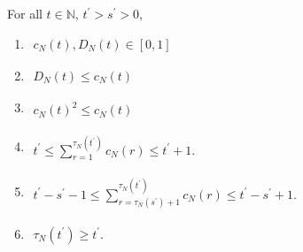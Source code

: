 \begin{prop}\label{thm:cN_properties}
For all $t\in\mathbb{N}$, $t^\prime > s^\prime >0$,
\begin{enumerate}[label=(\alph*)]
\item \label{item:cN_property1} \hspace{5pt}
    $\begin{aligned}
    c_N(t) , D_N(t) \in [0,1]
    \end{aligned}$
\item \label{item:cN_property2} \hspace{5pt}
    $\begin{aligned}
    D_N(t) \leq c_N(t)
    \end{aligned}$
\item \label{item:cN_property3} \hspace{5pt}
    $\begin{aligned}
    c_N(t)^2 \leq c_N(t) 
    \end{aligned}$
\item \label{item:cN_property4} \hspace{5pt}
    $\begin{aligned}
    t^\prime
    \leq \sum_{r=1}^{\tau_N(t^\prime)} c_N(r) 
    \leq t^\prime +1 .
    \end{aligned}$
\item \label{item:cN_property5} \hspace{5pt}
    $\begin{aligned}
    t^\prime - s^\prime -1
    \leq \sum_{r=\tau_N(s^\prime)+1}^{\tau_N(t^\prime)} c_N(r) 
    \leq t^\prime - s^\prime +1 .
    \end{aligned}$
\item \label{item:cN_property6} \hspace{5pt}
    $\begin{aligned}
    \tau_N(t^\prime) \geq t^\prime .
    \end{aligned}$
\end{enumerate}
\end{prop}

